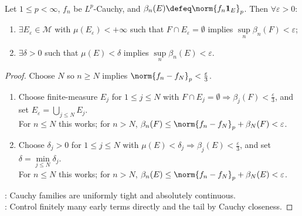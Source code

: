 \begin{proposition} \label{prop:lp-cauchy-local-mass-control} \\
Let $1\leq p<\infty$, $f_n$ be $L^p$-Cauchy, and $\beta_n(E)\defeq\norm{f_n\mathbf 1_E}_p$. Then $\forall\varepsilon>0$:
\begin{enumerate}[label=(\roman*)]
\setlength{\itemsep}{0pt}
\item $\exists E_\varepsilon\in\mathcal M$ with $\mu(E_\varepsilon)<+\infty$ such that $F\cap E_\varepsilon=\emptyset$ implies $\sup\limits_n\beta_n(F)<\varepsilon$;
\item $\exists\delta>0$ such that $\mu(E)<\delta$ implies $\sup\limits_n\beta_n(E)<\varepsilon$.
\end{enumerate}
\begin{proof}
Choose $N$ so $n\geq N$ implies $\norm{f_n-f_N}_p<\frac{\varepsilon}{3}$.
\begin{enumerate}[label=(\roman*)]
\setlength{\itemsep}{0pt}
\item Choose finite-measure $E_j$ for $1\leq j\leq N$ with $F\cap E_j=\emptyset\Rightarrow\beta_j(F)<\frac{\varepsilon}{3}$, and set $E_\varepsilon=\bigcup\limits_{j\leq N}E_j$.\\
For $n\leq N$ this works; for $n>N$, $\beta_n(F)\leq\norm{f_n-f_N}_p+\beta_N(F)<\varepsilon$.
\item Choose $\delta_j>0$ for $1\leq j\leq N$ with $\mu(E)<\delta_j\Rightarrow\beta_j(E)<\frac{\varepsilon}{3}$, and set $\delta=\min\limits_{j\leq N}\delta_j$.\\
For $n\leq N$ this works; for $n>N$, $\beta_n(E)\leq\norm{f_n-f_N}_p+\beta_N(E)<\varepsilon$.
\end{enumerate}
: Cauchy families are uniformly tight and absolutely continuous.\\
: Control finitely many early terms directly and the tail by Cauchy closeness.
\end{proof}
\end{proposition}

